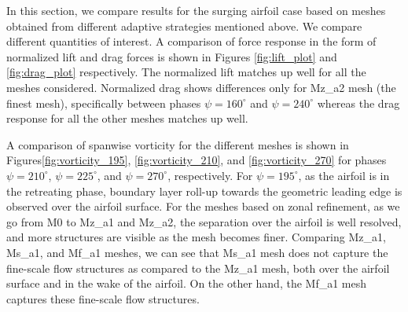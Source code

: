 In this section, we compare results for the surging airfoil case based on meshes obtained from different adaptive strategies mentioned above. 
We compare different quantities of interest. 
A comparison of force response in the form of normalized lift and drag forces is shown in Figures \ref{fig:lift_plot} and \ref{fig:drag_plot} respectively. The normalized lift matches up well for all the meshes considered. Normalized drag shows differences only for Mz\_a2 mesh (the finest mesh), specifically between phases $\psi=160^\circ$ and $\psi=240^\circ$ whereas the drag response for all the other meshes matches up well.

A comparison of spanwise vorticity for the different meshes is shown in Figures\ref{fig:vorticity_195}, \ref{fig:vorticity_210}, and \ref{fig:vorticity_270} for phases $\psi=210^\circ$, $\psi=225^\circ$, and $\psi=270^\circ$, respectively.
For $\psi=195^\circ$, as the airfoil is in the retreating phase, boundary layer roll-up towards the geometric leading edge is observed over the airfoil surface. For the meshes based on zonal refinement, as we go from M0 to Mz\_a1 and Mz\_a2, the separation over the airfoil is well resolved, and more structures are visible as the mesh becomes finer. Comparing Mz\_a1, Ms\_a1, and Mf\_a1 meshes, we can see that Ms\_a1 mesh does not capture the fine-scale flow structures as compared to the Mz\_a1 mesh, both over the airfoil surface and in the wake of the airfoil. On the other hand, the Mf\_a1 mesh captures these fine-scale flow structures.

